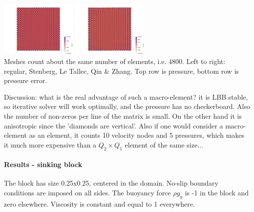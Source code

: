\begin{center}
\includegraphics[width=3.74cm]{python_codes/fieldstone_78/results/mms/p_error_2}
\includegraphics[width=3.74cm]{python_codes/fieldstone_78/results/mms/p_error_3}\\
{\captionfont Meshes count about the same number of elements, i.e. 4800. 
Left to right: regular, Stenberg, Le Tallec, Qin \& Zhang. Top row is pressure, 
bottom row is pressure error.} 
\end{center}


Discussion: what is the real advantage of such a macro-element? it is LBB stable, so 
iterative solver will work optimally, and the pressure has no checkerboard. 
Also the number of non-zeros per line of the matrix is small.  
On the other hand it is anisotropic since the 'diamonds are vertical'. 
Also if one would consider a macro-element as an element, it counts 10 velocity nodes and 5 pressures, 
which makes it much more expensive than a $Q_2\times Q_1$ element of the same size...

\paragraph{Results - sinking block}

The block has size 0.25x0.25, centered in the domain. No-slip boundary conditions are imposed on all 
sides. The buoyancy force $\rho g_y$ is -1 in the block and zero elsewhere. Viscosity is constant and 
equal to 1 everywhere. 

